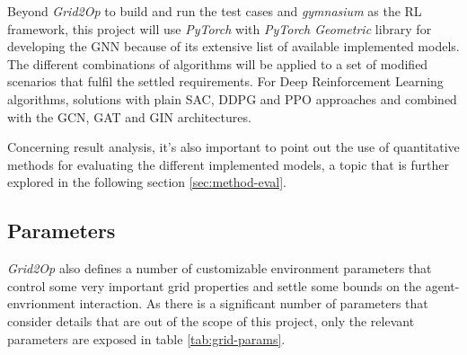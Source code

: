 Beyond \textit{Grid2Op} to build and run the test cases and \textit{gymnasium} as the RL framework, this project will use \textit{PyTorch} \cite{pytorchPyTorch} with \textit{PyTorch Geometric} \cite{feyFastGraphRepresentation2019} library for developing the \ac{GNN} because of its extensive list of available implemented models. The different combinations of algorithms will be applied to a set of modified scenarios that fulfil the settled requirements. For Deep Reinforcement Learning algorithms, solutions with plain \ac{SAC}, \ac{DDPG} and \ac{PPO} approaches and combined with the \ac{GCN}, \ac{GAT} and \ac{GIN} architectures.  \par
Concerning result analysis, it's also important to point out the use of quantitative methods for evaluating the different implemented models, a topic that is further explored in the following section \ref{sec:method-eval}.

\subsection{Parameters}

\textit{Grid2Op} also defines a number of customizable environment parameters that control some very important grid properties and settle some bounds on the agent-envrionment interaction. As there is a significant number of parameters that consider details that are out of the scope of this project, only the relevant parameters are exposed in table \ref{tab:grid-params}.

